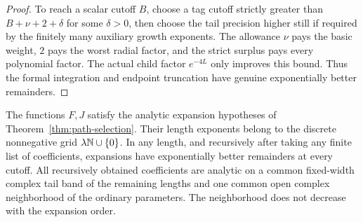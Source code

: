 \begin{proof}
To reach a scalar cutoff $B$, choose a tag cutoff strictly
greater than $B+\nu+2+\delta$ for some $\delta>0$, then choose
the tail precision higher still if required by the finitely
many auxiliary growth exponents.  The allowance $\nu$ pays
the basic weight, $2$ pays the worst radial factor, and the
strict surplus pays every polynomial factor.  The actual
child factor $e^{-4L}$ only improves this bound.  Thus the
formal integration and endpoint truncation have genuine
exponentially better remainders.
\end{proof}

\begin{proposition}
\label{ell:all-orders}
The functions $F,J$ satisfy the analytic expansion hypotheses
of Theorem~\ref{thm:path-selection}.  Their length exponents
belong to the discrete nonnegative grid $\lambda\mathbb{N}\cup\{0\}$.
In any length, and recursively after taking any finite list
of coefficients, expansions have exponentially better
remainders at every cutoff.  All recursively obtained
coefficients are analytic on a common fixed-width complex
tail band of the remaining lengths and one common open
complex neighborhood of the ordinary parameters.
The neighborhood does not decrease with the expansion order.
\end{proposition}

